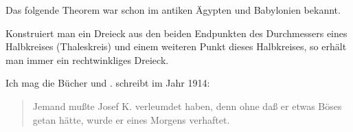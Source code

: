 Das folgende Theorem war schon im antiken Ägypten und Babylonien bekannt.
\begin{thm}
Konstruiert man ein Dreieck aus den beiden Endpunkten des Durchmessers eines Halbkreises (Thaleskreis) und einem weiteren Punkt dieses Halbkreises, so erhält man immer ein rechtwinkliges Dreieck.
\end{thm}

Ich mag die Bücher \cite[]{kafka2015prozess} und \cite{AC02615918}. \textcite[S. 1]{kafka2015prozess} schreibt im Jahr 1914:
\begin{quote}
Jemand mußte Josef K. verleumdet haben, denn ohne daß er etwas Böses getan hätte, wurde er eines Morgens verhaftet.
\end{quote}